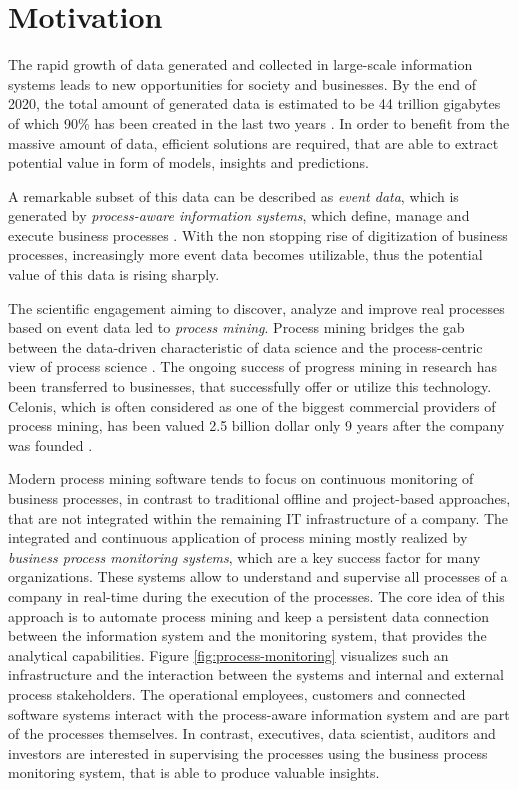 
\section{Motivation}

The rapid growth of data generated and collected in large-scale information systems leads to new opportunities for  society and businesses. 
By the end of 2020, the total amount of generated data is estimated to be 44 trillion gigabytes of which 90\% has been created in the last two years \cite{datagrowth}.
In order to benefit from the massive amount of data, efficient solutions are required, that are able to extract potential value in form of models, insights and predictions.

A remarkable subset of this data can be described as \textit{event data}, which is generated by \textit{process-aware information systems}, which define, manage and execute business processes \cite{DBLP:journals/topnoc/Aalst09}.
With the non stopping rise of digitization of business processes, increasingly more event data becomes utilizable, thus the potential value of this data is rising sharply.

The scientific engagement aiming to discover, analyze and improve real processes based on event data led to \textit{process mining}. Process mining bridges the gab between the data-driven characteristic of data science and the process-centric view of process science \cite{DBLP:books/sp/Aalst16}.
The ongoing success of progress mining in research has been transferred to businesses, that successfully offer or utilize this technology.
Celonis, which is often considered as one of the biggest commercial providers of process mining, has been valued 2.5 billion dollar only 9 years after the company was founded \cite{celonis}.

Modern process mining software tends to focus on continuous monitoring of business processes, in contrast to traditional offline and project-based approaches, that are not integrated within the remaining IT infrastructure of a company.
The integrated and continuous application of process mining mostly realized by \textit{business process monitoring systems}, which are a key success factor for many organizations.
These systems allow to understand and supervise all processes of a company in real-time during the execution of the processes.
The core idea of this approach is to automate process mining and keep a persistent data connection between the information system and the monitoring system, that provides the analytical capabilities.
Figure \ref{fig:process-monitoring} visualizes such an infrastructure and the interaction between the systems and internal and external process stakeholders.
The operational employees, customers and connected software systems interact with the process-aware information system and are part of the processes themselves.
In contrast, executives, data scientist, auditors and investors are interested in supervising the processes using the business process monitoring system, that is able to produce valuable insights.

